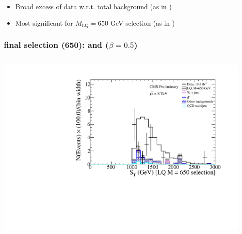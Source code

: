 \documentclass[bigger]{beamer}
\begin{document}
\begin{frame}
{
}%
\label{sec-3-4-1-2}

\begin{itemize}
\item Broad excess of data w.r.t. total background (as in \eejj)
\item Most significant for $M_{\text{LQ}} = 650$ GeV selection (as in \eejj)
\end{itemize}
\end{frame}
\begin{frame}
\frametitle{\enujj final selection (650): \ST and \mej ($\beta = 0.5$)}
\label{sec-3-4-2}
\begin{columns}
\begin{column}{0.6\textwidth}
\label{sec-3-4-2-1}

\centering
\ST
\includegraphics[width=\textwidth]{fig/enu/finalSelection/sT_LQ650_enujj.pdf}
\end{column}
\begin{column}{0.6\textwidth}
\label{sec-3-4-2-2}


\end{column}
\end{columns}
\end{frame}
\end{document}

